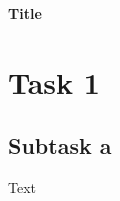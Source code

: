 \documentclass[a4paper,12pt]{article}
\begin{document}
\begin{center}
    \Large \bfseries Title
\end{center}

\raggedright

\section{Task 1}

\subsection{Subtask a}

Text
\end{document}
